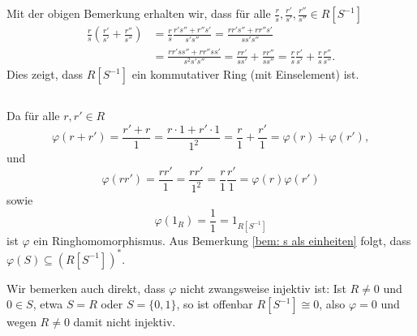 \documentclass[a4paper,10pt]{article}
\theoremstyle{definition}
\begin{document}
Mit der obigen Bemerkung erhalten wir, dass für alle $\frac{r}{s}, \frac{r'}{s'}, \frac{r''}{s''} \in R[S^{-1}]$
\begin{align*}
 \frac{r}{s} \left( \frac{r'}{s'} + \frac{r''}{s''} \right)
 &= \frac{r}{s} \frac{r's'' + r''s'}{s's''}
 = \frac{rr's''+rr''s'}{ss's''} \\
 &= \frac{rr'ss''+rr''ss'}{s^2s's''}
 = \frac{rr'}{ss'} + \frac{rr''}{ss''}
 = \frac{r}{s} \frac{r'}{s'} + \frac{r}{s} \frac{r''}{s''}.
\end{align*}
Dies zeigt, dass $R[S^{-1}]$ ein kommutativer Ring (mit Einselement) ist.


\subsection{}
Da für alle $r,r' \in R$
\[
 \varphi(r+r')
 = \frac{r'+r}{1}
 = \frac{r \cdot 1 + r' \cdot 1}{1^2}
 = \frac{r}{1} + \frac{r'}{1}
 = \varphi(r) + \varphi(r'),
\]
und
\[
 \varphi(rr')
 = \frac{rr'}{1}
 = \frac{rr'}{1^2}
 = \frac{r}{1} \frac{r'}{1}
 = \varphi(r)\varphi(r')
\]
sowie
\[
 \varphi(1_R)
 = \frac{1}{1}
 = 1_{R[S^{-1}]}
\]
ist $\varphi$ ein Ringhomomorphismus. Aus Bemerkung \ref{bem: s als einheiten} folgt, dass $\varphi(S) \subseteq (R[S^{-1}])^*$.

Wir bemerken auch direkt, dass $\varphi$ nicht zwangsweise injektiv ist: Ist $R \neq 0$ und $0 \in S$, etwa $S = R$ oder $S = \{0,1\}$, so ist offenbar $R[S^{-1}] \cong 0$, also $\varphi = 0$ und wegen $R \neq 0$ damit nicht injektiv.
\end{document}
